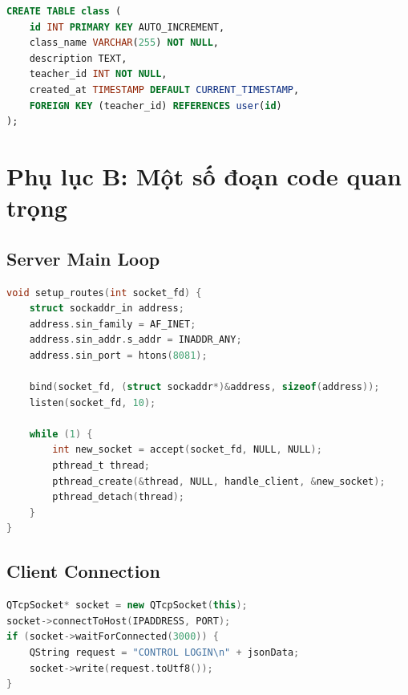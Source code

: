 ﻿\documentclass[12pt,a4paper]{report}
\begin{document}
\begin{lstlisting}[language=SQL]
CREATE TABLE class (
    id INT PRIMARY KEY AUTO_INCREMENT,
    class_name VARCHAR(255) NOT NULL,
    description TEXT,
    teacher_id INT NOT NULL,
    created_at TIMESTAMP DEFAULT CURRENT_TIMESTAMP,
    FOREIGN KEY (teacher_id) REFERENCES user(id)
);
\end{lstlisting}

\chapter{Phụ lục B: Một số đoạn code quan trọng}

\section{Server Main Loop}

\begin{lstlisting}[language=C]
void setup_routes(int socket_fd) {
    struct sockaddr_in address;
    address.sin_family = AF_INET;
    address.sin_addr.s_addr = INADDR_ANY;
    address.sin_port = htons(8081);
    
    bind(socket_fd, (struct sockaddr*)&address, sizeof(address));
    listen(socket_fd, 10);
    
    while (1) {
        int new_socket = accept(socket_fd, NULL, NULL);
        pthread_t thread;
        pthread_create(&thread, NULL, handle_client, &new_socket);
        pthread_detach(thread);
    }
}
\end{lstlisting}

\section{Client Connection}

\begin{lstlisting}[language=C++]
QTcpSocket* socket = new QTcpSocket(this);
socket->connectToHost(IPADDRESS, PORT);
if (socket->waitForConnected(3000)) {
    QString request = "CONTROL LOGIN\n" + jsonData;
    socket->write(request.toUtf8());
}
\end{lstlisting}
\end{document}
